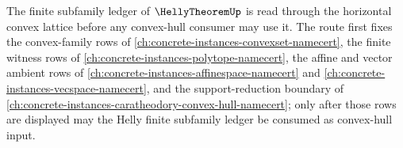 The finite subfamily ledger of $\HellyTheoremUp$ is read through the horizontal convex lattice before any convex-hull consumer may use it. The route first fixes the convex-family rows of \autoref{ch:concrete-instances-convexset-namecert}, the finite witness rows of \autoref{ch:concrete-instances-polytope-namecert}, the affine and vector ambient rows of \autoref{ch:concrete-instances-affinespace-namecert} and \autoref{ch:concrete-instances-vecspace-namecert}, and the support-reduction boundary of \autoref{ch:concrete-instances-caratheodory-convex-hull-namecert}; only after those rows are displayed may the Helly finite subfamily ledger be consumed as convex-hull input.
